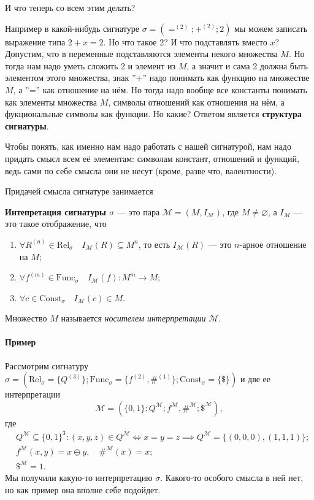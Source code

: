 \documentclass[a4paper, fleqn]{article}
\begin{document}
    И что теперь со всем этим делать?

    Например в какой-нибудь сигнатуре $\sigma = (=^{(2)}; +^{(2)}; 2)$ мы можем записать выражение типа
    $2 + x = 2$. Но что такое 2? И что подставлять вместо $x$? Допустим, что в переменные подставляются
    элементы некого множества $M$. Но тогда нам надо уметь сложить 2 и элемент из $M$, а значит и сама
    2 должна быть элементом этого множества, знак ''+'' надо понимать как функцию на множестве $M$, а 
    ''='' как отношение на нём. Но тогда надо вообще все константы понимать как элементы множества $M$,
    символы отношений как отношения на нём, а фукциональные символы как функции. Но какие? Ответом является
    \textbf{структура сигнатуры}.

    Чтобы понять, как именно нам надо работать с нашей сигнатурой, нам надо придать смысл всем её элементам:
    символам констант, отношений и функций, ведь сами по себе смысла они не несут (кроме, разве что, валентности).

    Придачей смысла сигнатуре занимается
    \begin{definition}
        \textbf{Интепретация сигнатуры $\sigma$} --- это пара $\mathcal{M} = (M, I_\mathcal{M})$,
        где $M \neq \varnothing$, а $I_\mathcal{M}$ --- это такое отображение, что
        \begin{enumerate}
            \item $\forall R^{(n)} \in \text{Rel}_\sigma \quad I_{\mathcal{M}}(R) \subseteq M^{n}$, 
            то есть $I_{\mathcal{M}}(R)$ --- это $n$-арное отношение на $M$;
            \item $\forall f^{(m)} \in \text{Func}_\sigma \quad I_{\mathcal{M}}(f) \colon M^{m} \to M$;
            \item $\forall c \in \text{Const}_\sigma \quad I_{\mathcal{M}}(c) \in M$.
        \end{enumerate}
        Множество $M$ называется {\it носителем интерпретации} $\mathcal{M}$.
    \end{definition}

    \paragraph{Пример}
    Рассмотрим сигнатуру $\sigma = (\text{Rel}_{\sigma} = \{ Q^{(3)} \}; \text{Func}_{\sigma} = \{ f^{(2)}, \#^{(1)} \}; \text{Const}_{\sigma} = \{ \$ \})$ и две ее интерпретации
    \[
        \mathcal{M} = ( \{ 0, 1 \}; Q^{\mathcal{M}}; f^{\mathcal{M}}, \#^{\mathcal{M}}; \$^{\mathcal{M}}),
    \]
    где 
    \begin{align}
        &Q^{\mathcal{M}} \subseteq \{0, 1\}^{3} \colon (x, y, z) \in Q^{\mathcal{M}} \iff x = y = z \implies Q^{\mathcal{M}} = \{ (0, 0, 0), (1, 1, 1)\}; \\
        &f^{\mathcal{M}}(x, y) = x \oplus y, \quad \#^{\mathcal{M}}(x) = x; \\
        &\$^{\mathcal{M}} = 1.
    \end{align}
    Мы получили какую-то интерпретацию $\sigma$.
    Какого-то особого смысла в ней нет, но как пример она вполне себе подойдет.
\end{document}
